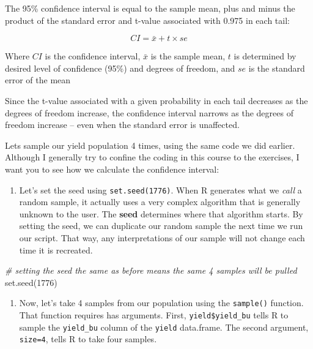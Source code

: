 \documentclass[
]{book}
\newenvironment{Shaded}{\begin{snugshade}}{\end{snugshade}}
\newcommand{\CommentTok}[1]{\textcolor[rgb]{0.56,0.35,0.01}{\textit{#1}}}
\newcommand{\DecValTok}[1]{\textcolor[rgb]{0.00,0.00,0.81}{#1}}
\newcommand{\FunctionTok}[1]{\textcolor[rgb]{0.00,0.00,0.00}{#1}}
\newcommand{\NormalTok}[1]{#1}
\providecommand{\tightlist}{%
  \setlength{\itemsep}{0pt}\setlength{\parskip}{0pt}}
\begin{document}
The 95\% confidence interval is equal to the sample mean, plus and minus
the product of the standard error and t-value associated with 0.975 in
each tail:

\[CI = \bar x + t \times se\]

Where \(CI\) is the confidence interval, \(\bar{x}\) is the sample mean, \(t\)
is determined by desired level of confidence (95\%) and degrees of
freedom, and \(se\) is the standard error of the mean

Since the t-value associated with a given probability in each tail
decreases as the degrees of freedom increase, the confidence interval
narrows as the degrees of freedom increase -- even when the standard
error is unaffected.

Lets sample our yield population 4 times, using the same code we did
earlier. Although I generally try to confine the coding in this course
to the exercises, I want you to see how we calculate the confidence
interval:

\begin{enumerate}
\def\labelenumi{\arabic{enumi}.}
\tightlist
\item
  Let's set the seed using \texttt{set.seed(1776)}. When R generates what we
  \emph{call} a random sample, it actually uses a very complex algorithm
  that is generally unknown to the user. The \textbf{seed} determines where
  that algorithm starts. By setting the seed, we can duplicate our
  random sample the next time we run our script. That way, any
  interpretations of our sample will not change each time it is
  recreated.
\end{enumerate}

\begin{Shaded}
\begin{Highlighting}[]
\CommentTok{\# setting the seed the same as before means the same 4 samples will be pulled}
\FunctionTok{set.seed}\NormalTok{(}\DecValTok{1776}\NormalTok{)}
\end{Highlighting}
\end{Shaded}

\begin{enumerate}
\def\labelenumi{\arabic{enumi}.}
\setcounter{enumi}{1}
\tightlist
\item
  Now, let's take 4 samples from our population using the \texttt{sample()}
  function. That function requires has arguments. First,
  \texttt{yield\$yield\_bu} tells R to sample the \texttt{yield\_bu} column of the
  \texttt{yield} data.frame. The second argument, \texttt{size=4}, tells R to take
  four samples.
\end{enumerate}
\end{document}
